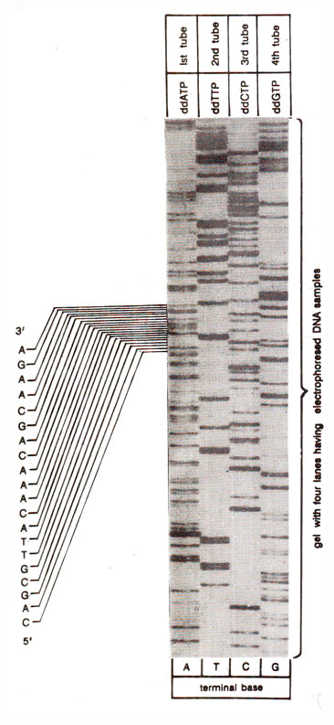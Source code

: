 \documentclass{beamer}
\begin{document}
\begin{frame}
\begin{columns}
\begin{column}{0.34\textwidth}
				\centering \includegraphics[keepaspectratio, width  =\textwidth]{img/sangerGel} 
			\end{column}
			\end{columns}		
			
\end{frame}
\end{document}
